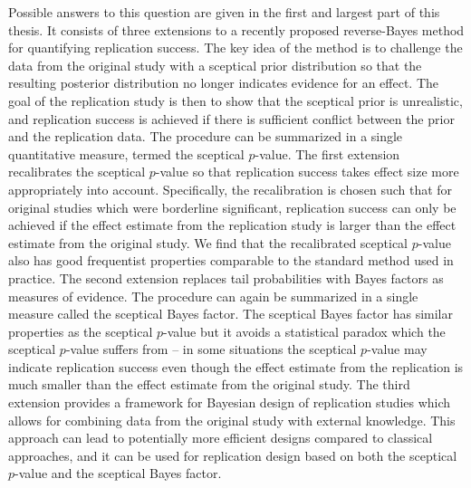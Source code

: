 Possible answers to this question are given in the first and largest part of
this thesis. It consists of three extensions to a recently proposed
reverse-Bayes method for quantifying replication success. The key idea of the
method is to challenge the data from the original study with a sceptical prior
distribution so that the resulting posterior distribution no longer indicates
evidence for an effect. The goal of the replication study is then to show that
the sceptical prior is unrealistic, and replication success is achieved if there
is sufficient conflict between the prior and the replication data. The procedure
can be summarized in a single quantitative measure, termed the sceptical
$p$-value.
The first extension recalibrates the sceptical $p$-value so that replication
success takes effect size more appropriately into account. Specifically, the
recalibration is chosen such that for original studies which were borderline
significant, replication success can only be achieved if the effect estimate
from the replication study is larger than the effect estimate from the original
study. We find that the recalibrated sceptical $p$-value also has good
frequentist properties comparable to the standard method used in practice.
The second extension replaces tail probabilities with Bayes factors as measures
of evidence. The procedure can again be summarized in a single measure called
the sceptical Bayes factor.
The sceptical Bayes factor has similar properties as the sceptical $p$-value but
it avoids a statistical paradox which the sceptical $p$-value suffers from -- in
some situations the sceptical $p$-value may indicate replication success even
though the effect estimate from the replication is much smaller than the effect
estimate from the original study. %
The third extension provides a framework for Bayesian design of replication
studies which allows for combining data from the original study with external
knowledge. This approach can lead to potentially more efficient designs compared
to classical approaches, and it can be used for replication design based on both
the sceptical $p$-value and the sceptical Bayes factor.

